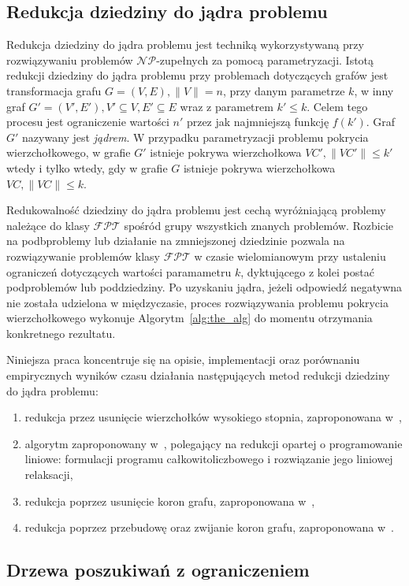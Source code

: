 \subsection{Redukcja dziedziny do jądra problemu}\label{subsection_kernelization}
\par{
  Redukcja dziedziny do jądra problemu jest techniką wykorzystywaną przy
  rozwiązywaniu problemów $\mathcal{NP}$-zupełnych za pomocą parametryzacji.
  Istotą redukcji dziedziny do jądra problemu przy problemach dotyczących grafów
  jest transformacja grafu $G=(V,E), \|V\|=n$, przy danym parametrze $k$, w inny
  graf $G\prime=(V\prime, E\prime), V\prime \subseteq V, E\prime \subseteq E$
  wraz z parametrem $k\prime \leq k$.
  Celem tego procesu jest ograniczenie wartości $n\prime$ przez jak najmniejszą
  funkcję $f(k\prime)$.
  Graf $G\prime$ nazywany jest \emph{jądrem}.
  W przypadku parametryzacji problemu pokrycia wierzchołkowego, w grafie
  $G\prime$ istnieje pokrywa wierzchołkowa $VC\prime, \|VC\prime\|\leq k\prime$ 
  wtedy i tylko wtedy, gdy w grafie $G$ istnieje pokrywa wierzchołkowa $VC,
  \|VC\| \leq k$.
}
\par{
  Redukowalność dziedziny do jądra problemu jest cechą wyróżniającą problemy 
  należące do klasy $\mathcal{FPT}$ spośród grupy wszystkich znanych problemów.
  Rozbicie na podbproblemy lub działanie na zmniejszonej dziedzinie pozwala na
  rozwiązywanie problemów klasy $\mathcal{FPT}$ w czasie wielomianowym przy
  ustaleniu ograniczeń dotyczących wartości paramametru $k$, dyktującego z kolei
  postać podproblemów lub poddziedziny.
  Po uzyskaniu jądra, jeżeli odpowiedź negatywna nie została udzielona w
  międzyczasie, proces rozwiązywania problemu pokrycia wierzchołkowego
  wykonuje Algorytm~\ref{alg:the_alg} do momentu otrzymania konkretnego
  rezultatu.
}
\par{
  Niniejsza praca koncentruje się na opisie, implementacji oraz porównaniu
  empirycznych wyników czasu działania następujących metod redukcji dziedziny do
  jądra problemu:
  \begin{enumerate}
    \item redukcja przez usunięcie wierzchołków wysokiego stopnia, zaproponowana
      w~\cite{KernelizationAlgorithms04},
    \item algorytm zaproponowany w~\cite{KernelizationAlgorithms04}, polegający
      na redukcji opartej o programowanie liniowe: formulacji programu
      całkowitoliczbowego i rozwiązanie jego liniowej relaksacji,
    \item redukcja poprzez usunięcie koron grafu, zaproponowana
      w~\cite{abukhzam03},
    \item redukcja poprzez przebudowę oraz zwijanie koron grafu, zaproponowana
      w~\cite{ImprovedBounds10}.
  \end{enumerate}
}
\subsection{Drzewa poszukiwań z ograniczeniem}\label{subsection_bound_search_trees}
